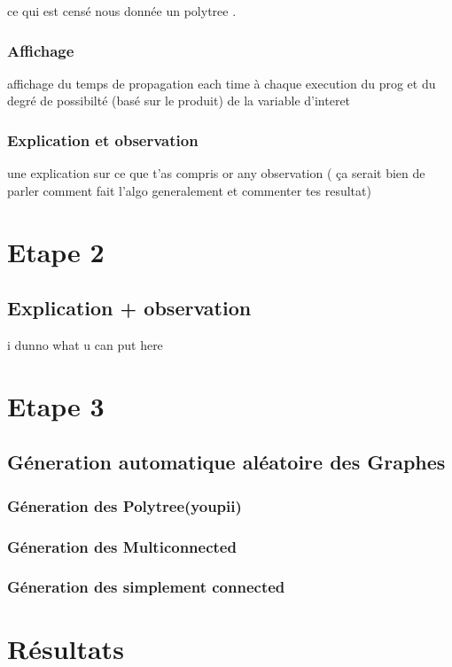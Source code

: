 \documentclass[12pt,a4paper,oneside]{book}
\begin{document}
	ce qui est censé nous donnée un polytree .
	
	
	\subsubsection{Affichage}
	affichage du temps de propagation each time à chaque execution du prog et du degré de possibilté (basé sur le produit) de la variable d'interet 
	\subsubsection{Explication et observation}
	une explication  sur ce que t'as compris or any observation ( ça serait bien de parler comment fait l'algo generalement et commenter tes resultat)
	
	\section{Etape 2}
	\subsection{Explication + observation }
       i dunno what u can put here
       
    \section{Etape 3}
    \subsection{Géneration automatique aléatoire des Graphes}
    \subsubsection{Géneration des Polytree(youpii)}
    \subsubsection{Géneration des Multiconnected}
    \subsubsection{Géneration des simplement connected}
    \section{Résultats}
    
\end{document}
